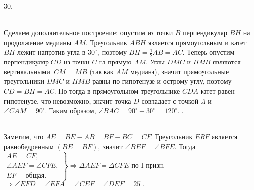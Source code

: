 30. \begin{figure}[ht!]
\end{figure}\\
Сделаем дополнительное построение: опустим из точки $B$ перпендикуляр $BH$ на продолжение медианы $AM.$ Треугольник $ABH$ является прямоугольным и катет $BH$ лежит напротив угла в $30^\circ,$ поэтому $BH=\frac{1}{2}AB=AC.$ Теперь опустим перпендикуляр $CD$ из точки $C$ на прямую $AM.$ Углы $DMC$ и $HMB$ являются вертикальными, $CM=MB$ (так как $AM$ медиана), значит прямоугольные треугольники $DMC$ и $HMB$ равны по гипотенузе и острому углу, поэтому $CD=BH=AC.$ Но тогда в прямоугольном треугольнике $CDA$ катет равен гипотенузе, что невозможно, значит точка $D$ совпадает с точкой $A$ и $\angle CAM=90^\circ.$ Таким образом, $\angle BAC=90^\circ+30^\circ=120^\circ.$\newpage
{}. \begin{figure}[ht!]
\end{figure}\\
Заметим, что $AE=BE-AB=BF-BC=CF.$ Треугольник $EBF$ является равнобедренным $(BE=BF),$ значит $\angle BEF=\angle BFE.$ Тогда
$\left.\begin{array}{l}AE=CF,\\
\angle AEF=\angle CFE,\\
EF\text{--- общая.}  \end{array}\right\}\Rightarrow \Delta AEF=\Delta CFE\text{ по I призн.}$\\$\Rightarrow \angle EFD=\angle EFA=\angle CEF=\angle DEF=25^\circ.$\\
